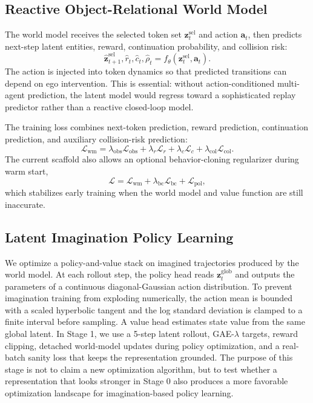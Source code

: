 \documentclass[journal]{IEEEtran}
\begin{document}
\subsection{Reactive Object-Relational World Model}
The world model receives the selected token set $\mathbf{z}^{\mathrm{sel}}_t$ and action $\mathbf{a}_t$, then predicts next-step latent entities, reward, continuation probability, and collision risk:
\begin{equation}
\hat{\mathbf{z}}^{\mathrm{sel}}_{t+1}, \hat{r}_t, \hat{c}_t, \hat{\rho}_t =
f_\theta(\mathbf{z}^{\mathrm{sel}}_t, \mathbf{a}_t).
\label{eq:worldmodel}
\end{equation}
The action is injected into token dynamics so that predicted transitions can depend on ego intervention. This is essential: without action-conditioned multi-agent prediction, the latent model would regress toward a sophisticated replay predictor rather than a reactive closed-loop model.

The training loss combines next-token prediction, reward prediction, continuation prediction, and auxiliary collision-risk prediction:
\begin{equation}
\mathcal{L}_{\mathrm{wm}} =
\lambda_{\mathrm{obs}}\mathcal{L}_{\mathrm{obs}} +
\lambda_{r}\mathcal{L}_{r} +
\lambda_{c}\mathcal{L}_{c} +
\lambda_{\mathrm{col}}\mathcal{L}_{\mathrm{col}}.
\label{eq:wmloss}
\end{equation}
The current scaffold also allows an optional behavior-cloning regularizer during warm start,
\begin{equation}
\mathcal{L} = \mathcal{L}_{\mathrm{wm}} + \lambda_{\mathrm{bc}}\mathcal{L}_{\mathrm{bc}} + \mathcal{L}_{\mathrm{pol}},
\label{eq:totalloss}
\end{equation}
which stabilizes early training when the world model and value function are still inaccurate.

\subsection{Latent Imagination Policy Learning}
We optimize a policy-and-value stack on imagined trajectories produced by the world model. At each rollout step, the policy head reads $\mathbf{z}^{\mathrm{glob}}_t$ and outputs the parameters of a continuous diagonal-Gaussian action distribution. To prevent imagination training from exploding numerically, the action mean is bounded with a scaled hyperbolic tangent and the log standard deviation is clamped to a finite interval before sampling. A value head estimates state value from the same global latent. In Stage 1, we use a 5-step latent rollout, GAE-$\lambda$ targets, reward clipping, detached world-model updates during policy optimization, and a real-batch sanity loss that keeps the representation grounded. The purpose of this stage is not to claim a new optimization algorithm, but to test whether a representation that looks stronger in Stage 0 also produces a more favorable optimization landscape for imagination-based policy learning.
\end{document}
